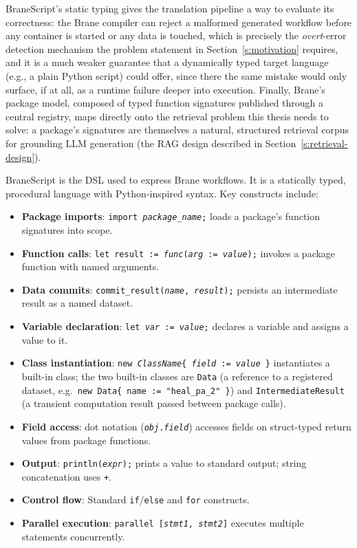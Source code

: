 BraneScript's static typing gives the translation pipeline a way to evaluate its correctness:
the Brane compiler can reject a malformed generated workflow before any container
is started or any data is touched, which is precisely the \emph{overt}-error
detection mechanism the problem statement in Section~\ref{s:motivation}
requires, and it is a much weaker guarantee that a dynamically typed target
language (e.g., a plain Python script) could offer, since there the same
mistake would only surface, if at all, as a runtime failure deeper into
execution. Finally, Brane's package model, composed of typed function signatures
published through a central registry, maps directly onto the retrieval
problem this thesis needs to solve: a package's signatures are themselves a
natural, structured retrieval corpus for grounding LLM generation (the RAG
design described in Section~\ref{s:retrieval-design}).

BraneScript is the DSL used to express Brane workflows. It is a statically
typed, procedural language with Python-inspired syntax. Key constructs include:

\begin{itemize}
    \item \textbf{Package imports}: \texttt{import \textit{package\_name};} loads
        a package's function signatures into scope.
    \item \textbf{Function calls}: \texttt{let result := \textit{func}(\textit{arg} := \textit{value});} invokes a package function with named arguments.
    \item \textbf{Data commits}: \texttt{commit\_result(\textit{name}, \textit{result});} persists an intermediate result as a named dataset.
    \item \textbf{Variable declaration}: \texttt{let \textit{var} := \textit{value};} declares a variable and assigns a value to it.
    \item \textbf{Class instantiation}: \texttt{new \textit{ClassName}\{ \textit{field} := \textit{value} \}} instantiates a built-in class; the two built-in classes are \texttt{Data} (a reference to a registered dataset, e.g.\ \texttt{new Data\{ name := "heal\_pa\_2" \}}) and \texttt{IntermediateResult} (a transient computation result passed between package calls).
    \item \textbf{Field access}: dot notation (\texttt{\textit{obj}.\textit{field}}) accesses fields on struct-typed return values from package functions.
    \item \textbf{Output}: \texttt{println(\textit{expr});} prints a value to standard output; string concatenation uses \texttt{+}.
    \item \textbf{Control flow}: Standard \texttt{if}/\texttt{else} and
        \texttt{for} constructs.
    \item \textbf{Parallel execution}: \texttt{parallel [\textit{stmt1}, \textit{stmt2}]} executes multiple statements concurrently.
\end{itemize}

